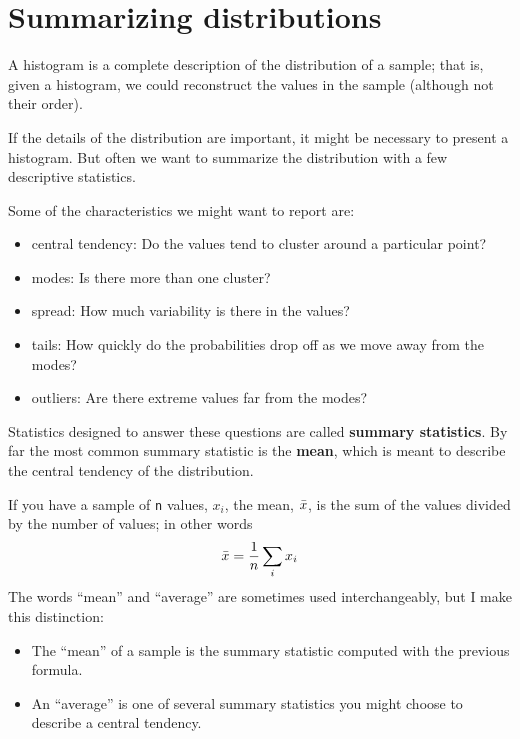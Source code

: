 \section{Summarizing distributions}
\label{mean}

A histogram is a complete description of the distribution of a sample;
that is, given a histogram, we could reconstruct the values in the
sample (although not their order).

If the details of the distribution are important, it might be
necessary to present a histogram.  But often we want to
summarize the distribution with a few descriptive statistics.

Some of the characteristics we might want to report are:

\begin{itemize}

\item central tendency: Do the values tend to cluster around
a particular point?

\item modes: Is there more than one cluster?

\item spread: How much variability is there in the values?

\item tails: How quickly do the probabilities drop off as we
move away from the modes?

\item outliers: Are there extreme values far from the modes?

\end{itemize}

Statistics designed to answer these questions are called {\bf summary
  statistics}.  By far the most common summary statistic is the {\bf
  mean}, which is meant to describe the central tendency of the
distribution.    

If you have a sample of {\tt n} values, $x_i$, the mean, $\bar{x}$, is
the sum of the values divided by the number of values; in other words
%
\[ \bar{x} = \frac{1}{n} \sum_i x_i \]
%
The words ``mean'' and ``average'' are sometimes used interchangeably,
but I make this distinction:

\begin{itemize}

\item The ``mean'' of a sample is the summary statistic computed with
  the previous formula.

\item An ``average'' is one of several summary statistics you might
  choose to describe a central tendency.

\end{itemize}

